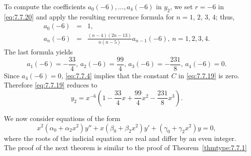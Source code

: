 \documentclass{ximera}
\begin{document}
\begin{example}
\begin{explanation}
To compute the coefficients
$a_0(-6),\dots,a_4(-6)$ in $y_2$, we
set $r=-6$ in \eqref{eq:7.7.20} and apply the resulting recurrence
formula for $n=1$, $2$, $3$, $4$;   thus,
\begin{eqnarray*}
a_0(-6)&=&1,\\
a_n(-6)&=&\frac{(n-4)(2n-13)}{n(n-5)}a_{n-1}(-6),\,n=1,2,3,4.
\end{eqnarray*}
The last formula yields
$$
a_1(-6)=-\frac{33}{4},\,a_2(-6)=\frac{99}{4},\,a_3(-6)=-\frac{231}{8},\,a_4(-6)=0.
$$
Since $a_4(-6)=0$, \eqref{eq:7.7.4} implies that the constant $C$
in \eqref{eq:7.7.19} is zero. Therefore \eqref{eq:7.7.19} reduces
to
$$
y_2=x^{-6}\left(1-\frac{33}{4}x+\frac{99}{4}x^2-\frac{231}{8}x^3\right).
$$
\end{explanation}
\end{example}

We now consider   equations  of the form
$$
x^2(\alpha_0+\alpha_2x^2)y''+x(\beta_0+\beta_2x^2)y'
+(\gamma_0+\gamma_2x^2)y=0,
$$
where the roots of the indicial equation are real and differ by an
even integer. 
The  proof of the next theorem is similar to the proof of
Theorem~\ref{thmtype:7.7.1} %
\end{document}
